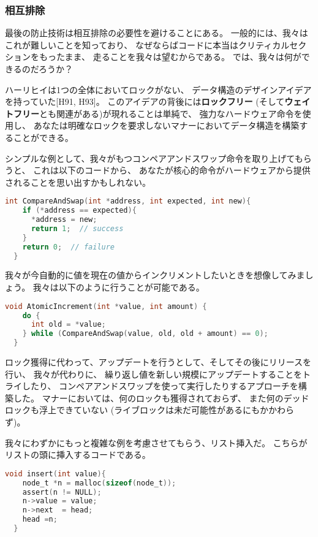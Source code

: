 \documentclass[11pt,a4paper, uplatex]{jsarticle}
\begin{document}
\subsubsection{相互排除}
最後の防止技術は相互排除の必要性を避けることにある。
一般的には、我々はこれが難しいことを知っており、
なぜならばコードに本当はクリティカルセクションをもったまま、
走ることを我々は望むからである。
では、我々は何ができるのだろうか？

ハーリヒイは1つの全体においてロックがない、
データ構造のデザインアイデアを持っていた[H91, H93]。
このアイデアの背後には\textbf{ロックフリー}
(そして\textbf{ウェイトフリー}とも関連がある)が現れることは単純で、
強力なハードウェア命令を使用し、
あなたは明確なロックを要求しないマナーにおいてデータ構造を構築することができる。

シンプルな例として、我々がもつコンペアアンドスワップ命令を取り上げてもらうと、
これは以下のコードから、
あなたが核心的命令がハードウェアから提供されることを思い出すかもしれない。


\begin{lstlisting}[language=c]
  int CompareAndSwap(int *address, int expected, int new){
    if (*address == expected){
      *address = new;
      return 1;  // success
    }
    return 0;  // failure
  }
\end{lstlisting}

我々が今自動的に値を現在の値からインクリメントしたいときを想像してみましょう。
我々は以下のように行うことが可能である。

\begin{lstlisting}[language=c]
  void AtomicIncrement(int *value, int amount) {
    do {
      int old = *value;
    } while (CompareAndSwap(value, old, old + amount) == 0);
  }
\end{lstlisting}

ロック獲得に代わって、アップデートを行うとして、そしてその後にリリースを行い、
我々が代わりに、
繰り返し値を新しい規模にアップデートすることをトライしたり、
コンペアアンドスワップを使って実行したりするアプローチを構築した。
マナーにおいては、何のロックも獲得されておらず、
また何のデッドロックも浮上できていない
(ライブロックは未だ可能性があるにもかかわらず)。

我々にわずかにもっと複雑な例を考慮させてもらう、リスト挿入だ。
こちらがリストの頭に挿入するコードである。


\begin{lstlisting}[language=c]
  void insert(int value){
    node_t *n = malloc(sizeof(node_t));
    assert(n != NULL);
    n->value = value;
    n->next  = head;
    head =n;
  }
\end{lstlisting}
\end{document}
